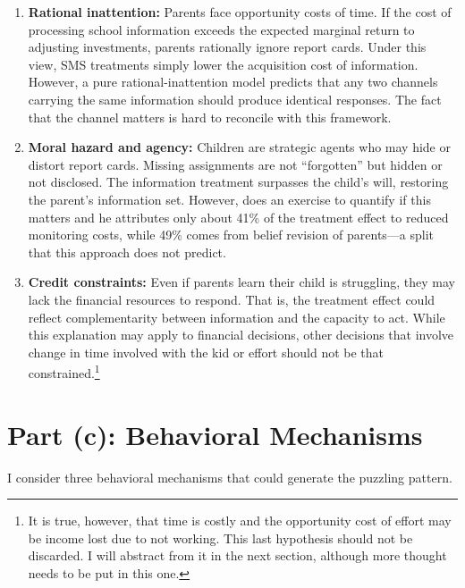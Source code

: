 \documentclass[11pt]{article}
\begin{document}
\begin{enumerate}
    \item \textbf{Rational inattention:} Parents face opportunity costs of time. If the cost of processing school information exceeds the expected marginal return to adjusting investments, parents rationally ignore report cards. Under this view, SMS treatments simply lower the acquisition cost of information. However, a pure rational-inattention model predicts that any two channels carrying the same information should produce identical responses. The fact that the channel matters is hard to reconcile with this framework.

    \item \textbf{Moral hazard and agency:} Children are strategic agents who may hide or distort report cards. Missing assignments are not ``forgotten'' but hidden or not disclosed. The information treatment surpasses the child's will, restoring the parent's information set. However, \citet{bergman2021information} does an exercise to quantify if this matters and he attributes only about 41\% of the treatment effect to reduced monitoring costs, while 49\% comes from belief revision of parents---a split that this approach does not predict.

    \item \textbf{Credit constraints:} Even if parents learn their child is struggling, they may lack the financial resources to respond. That is, the treatment effect could reflect complementarity between information and the capacity to act. While this explanation may apply to financial decisions, other decisions that involve change in time involved with the kid or effort should not be that constrained.\footnote{It is true, however, that time is costly and the opportunity cost of effort may be income lost due to not working. This last hypothesis should not be discarded. I will abstract from it in the next section, although more thought needs to be put in this one.}
\end{enumerate}

\section{Part (c): Behavioral Mechanisms}

I consider three behavioral mechanisms that could generate the puzzling pattern.
\end{document}
